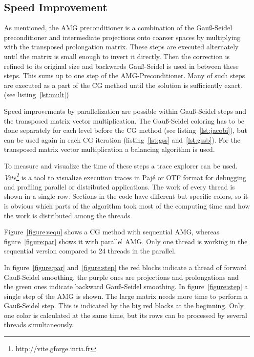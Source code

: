\documentclass[a4paper,11pt]{scrartcl}
\begin{document}
\subsection{Speed Improvement}
As mentioned, the AMG preconditioner is a combination of the Gauß-Seidel
preconditioner and intermediate projections onto coarser spaces
by multiplying with the transposed prolongation matrix. These steps are
executed alternately until the matrix is small enough to invert it directly.
Then the correction is refined to its original size and backwards Gauß-Seidel is
used in between these steps.
This sums up to one step of the AMG-Preconditioner. Many of such steps are
executed as a part of the CG method until the solution is sufficiently exact.
(see listing~\ref{lst:mult})

Speed improvements by parallelization are possible within Gauß-Seidel steps
and the transposed matrix vector multiplication. The Gauß-Seidel coloring has to
be done separately for each level before the CG method
(see listing~\ref{lst:jacobi}), but can be used again
in each CG iteration (listing~\ref{lst:gss} and~\ref{lst:gssb}).
For the transposed matrix vector multiplication a balancing algorithm is used.

To measure and visualize the time of these steps a trace explorer can be used.
{\em Vite\footnote{http://vite.gforge.inria.fr}}\/ is a tool to visualize
execution traces in Pajé or OTF format for debugging and profiling parallel or
distributed applications.
The work of every thread is shown in a single row. Sections in the code have
different but specific colors, so it is obvious which parts of the algorithm
took most of the computing time and how the work is distributed among the
threads.

Figure~\ref{figure:sequ} shows a CG method with sequential AMG, whereas
figure~\ref{figure:par} shows it with parallel AMG\@.
Only one thread is working in the sequential version compared to 24 threads in
the parallel.

In figure~\ref{figure:par} and~\ref{figure:step} the red blocks indicate a
thread of forward Gauß-Seidel smoothing, the purple ones are projections and
prolongations and the green ones indicate backward Gauß-Seidel smoothing.
In figure~\ref{figure:step} a single step of the AMG is shown. The large matrix
needs more time to perform a Gauß-Seidel step.
This is indicated by the big red blocks at the beginning. Only one color is
calculated at the same time, but its rows can be processed by several threads
simultaneously.
\end{document}
